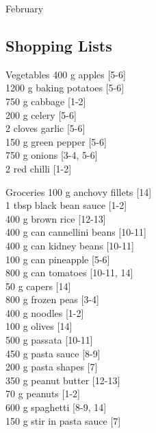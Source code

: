 \begin{menu}{February}
    \subsection*{Shopping Lists}
      \begin{shoppinglist}{Vegetables}
      400 g apples {\scriptsize[5-6]}\\
      1200 g baking potatoes {\scriptsize[5-6]}\\
      750 g cabbage {\scriptsize[1-2]}\\
      200 g celery {\scriptsize[5-6]}\\
      2 cloves garlic {\scriptsize[5-6]}\\
      150 g green pepper {\scriptsize[5-6]}\\
      750 g onions {\scriptsize[3-4, 5-6]}\\
      2  red chilli {\scriptsize[1-2]}\\
      \end{shoppinglist}%
      \begin{shoppinglist}{Groceries}
      100 g anchovy fillets {\scriptsize[14]}\\
      1 tbsp black bean sauce {\scriptsize[1-2]}\\
      400 g brown rice {\scriptsize[12-13]}\\
      400 g can cannellini beans {\scriptsize[10-11]}\\
      400 g can kidney beans {\scriptsize[10-11]}\\
      100 g can pineapple {\scriptsize[5-6]}\\
      800 g can tomatoes {\scriptsize[10-11, 14]}\\
      50 g capers {\scriptsize[14]}\\
      800 g frozen peas {\scriptsize[3-4]}\\
      400 g noodles {\scriptsize[1-2]}\\
      100 g olives {\scriptsize[14]}\\
      500 g passata {\scriptsize[10-11]}\\
      450 g pasta sauce {\scriptsize[8-9]}\\
      200 g pasta shapes {\scriptsize[7]}\\
      350 g peanut butter {\scriptsize[12-13]}\\
      70 g peanuts {\scriptsize[1-2]}\\
      600 g spaghetti {\scriptsize[8-9, 14]}\\
      150 g stir in pasta sauce {\scriptsize[7]}\\

\end{shoppinglist}
\end{menu}
